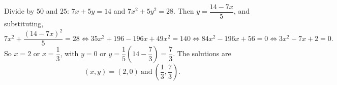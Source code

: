 Divide by $50$ and $25$: $7x+5y=14$ and $7x^2+5y^2=28$. Then $y=\dfrac{14-7x}{5}$, and substituting,
\[7x^2+\dfrac{(14-7x)^2}{5}=28\iff35x^2+196-196x+49x^2=140\iff84x^2-196x+56=0\iff3x^2-7x+2=0.\]
So $x=2$ or $x=\dfrac13$, with $y=0$ or $y=\dfrac15\left(14-\dfrac73\right)=\dfrac73$. The solutions are
\[\boxed{(x,y)=(2,0)\ \text{and}\ \left(\dfrac13,\dfrac73\right)}.\]
